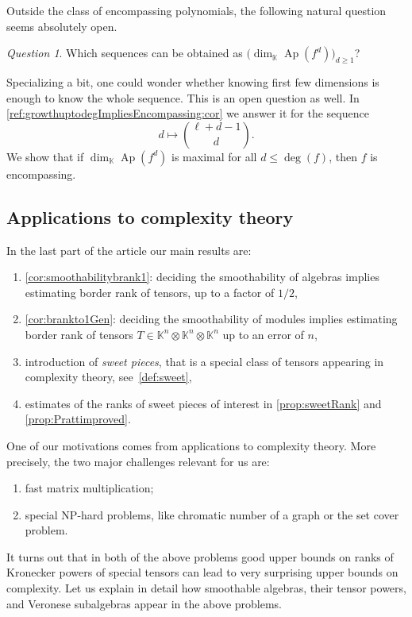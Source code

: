 \documentclass[a4paper,11pt,reqno]{amsart}
\newcommand{\bbK}{\mathbb{K}}
\DeclareMathOperator{\Ap}{Ap}
\numberwithin{equation}{section}
\theoremstyle{definition}
\theoremstyle{plain}
\theoremstyle{remark}
\newtheorem{question}[defn]{Question}
\begin{document}
Outside the class of encompassing polynomials, the following natural question
seems absolutely open.
\begin{question}
    Which sequences can be obtained as $\bigl(\dim_{\bbK} \Ap(f^d)\bigr)_{d\geq 1}$?
\end{question}
Specializing a bit, one could wonder
whether knowing first few dimensions is enough to know the whole sequence.
This is an open question as well. In \autoref{ref:growthuptodegImpliesEncompassing:cor} we answer it for
the sequence \[d\mapsto \binom{\ell+d-1}{d}.\]
We show that
if $\dim_{\bbK} \Ap(f^d)$ is maximal for all $d\leq \deg(f)$, then $f$ is
encompassing.

\subsection{Applications to complexity theory} In the last part of the article our main results are:
\begin{enumerate}[label=(\arabic*), left= 3pt, widest=2,nosep]
    \item \autoref{cor:smoothabilitybrank1}: deciding {the} smoothability of
        algebras implies estimating border rank of tensors, up to a
    factor of $1/2$,
\item \autoref{cor:brankto1Gen}: deciding {the} smoothability of modules implies estimating border rank of tensors $T\in
    \bbK^n\otimes\bbK^n\otimes \bbK^n$ up to an error of $n$,
\item introduction of \emph{sweet pieces}, that is a special class of
    tensors appearing in complexity theory, see~\autoref{def:sweet},
\item estimates of {the} ranks of sweet pieces of interest in \autoref{prop:sweetRank} and \autoref{prop:Prattimproved}.
\end{enumerate}
One of our motivations comes from applications to complexity theory. More precisely, the two major challenges relevant for us are:
\begin{enumerate}[label=(\arabic*), left= 3pt, widest=2,nosep]
\item fast matrix multiplication;
\item special NP-hard problems, like chromatic number of a graph or the set cover problem.
\end{enumerate}
It turns out that in both of the above problems good upper bounds on ranks of Kronecker powers of special tensors can lead to very surprising upper bounds on complexity.
Let us explain in detail how smoothable algebras, their tensor powers, and Veronese subalgebras appear in {the above problems.}
\end{document}
